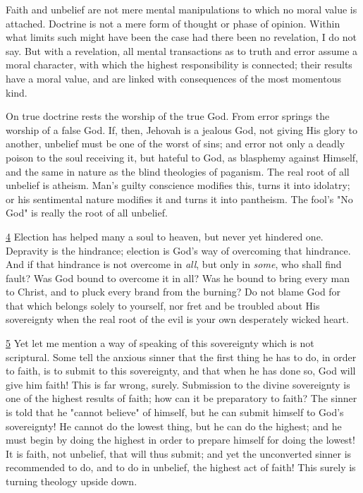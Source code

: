 \documentclass[
]{book}
\begin{document}
Faith and unbelief are not mere mental manipulations to which no moral value is attached. Doctrine is not a mere form of thought or phase of opinion. Within what limits such might have been the case had there been no revelation, I do not say. But with a revelation, all mental transactions as to truth and error assume a moral character, with which the highest responsibility is connected; their results have a moral value, and are linked with consequences of the most momentous kind.

On true doctrine rests the worship of the true God. From error springs the worship of a false God. If, then, Jehovah is a jealous God, not giving His glory to another, unbelief must be one of the worst of sins; and error not only a deadly poison to the soul receiving it, but hateful to God, as blasphemy against Himself, and the same in nature as the blind theologies of paganism. The real root of all unbelief is atheism. Man's guilty conscience modifies this, turns it into idolatry; or his sentimental nature modifies it and turns it into pantheism. The fool's "No God" is really the root of all unbelief.

\protect\hyperlink{sdfootnote4anc}{4} Election has helped many a soul to heaven, but never yet hindered one. Depravity is the hindrance; election is God's way of overcoming that hindrance. And if that hindrance is not overcome in \emph{all}, but only in \emph{some}, who shall find fault? Was God bound to overcome it in all? Was he bound to bring every man to Christ, and to pluck every brand from the burning? Do not blame God for that which belongs solely to yourself, nor fret and be troubled about His sovereignty when the real root of the evil is your own desperately wicked heart.

\protect\hyperlink{sdfootnote5anc}{5} Yet let me mention a way of speaking of this sovereignty which is not scriptural. Some tell the anxious sinner that the first thing he has to do, in order to faith, is to submit to this sovereignty, and that when he has done so, God will give him faith! This is far wrong, surely. Submission to the divine sovereignty is one of the highest results of faith; how can it be preparatory to faith? The sinner is told that he "cannot believe" of himself, but he can submit himself to God's sovereignty! He cannot do the lowest thing, but he can do the highest; and he must begin by doing the highest in order to prepare himself for doing the lowest! It is faith, not unbelief, that will thus submit; and yet the unconverted sinner is recommended to do, and to do in unbelief, the highest act of faith! This surely is turning theology upside down.
\end{document}
